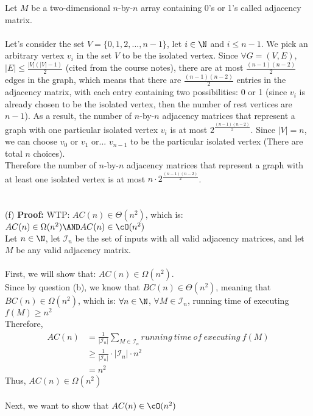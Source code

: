 \documentclass[12pt]{article}
\begin{document}
Let $M$ be a two-dimensional $n$-by-$n$ array containing 0's or 1's called adjacency matrix.\\
\\
Let's consider the set $V=\{0,1,2,...,n-1\}$, let $i\in \N$ and $i\le n-1$. We pick an arbitrary vertex $v_i$ in the set $V$ to be the isolated vertex. Since $\forall G=(V,E)$, $|E| \le \frac{|V|(|V|-1)}{2}$ (cited from the course notes), there are at most $\frac{(n-1)(n-2)}{2}$ edges in the graph, which means that there are $\frac{(n-1)(n-2)}{2}$ entries in the adjacency matrix, with each entry containing two possibilities: 0 or 1 (since $v_i$ is already chosen to be the isolated vertex, then the number of rest vertices are $n-1$). As a result, the number of $n$-by-$n$ adjacency matrices that represent a graph with one particular isolated vertex $v_i$ is at most $2^{\frac{(n-1)(n-2)}{2}}$. Since $|V| = n$, we can choose $v_0$ or $v_1$ or... $v_{n-1}$ to be the particular isolated vertex (There are total $n$ choices).\\
Therefore the number of $n$-by-$n$ adjacency matrices that represent a graph with at least one isolated vertex is at most $n\cdot 2^{\frac{(n-1)(n-2)}{2}}$.
\\
\\
\\
\noindent(f) \textbf{Proof:} WTP: $AC(n) \in \Theta(n^2)$, which is: $AC(n) \in \Omega(n^2) \AND AC(n) \in \cO(n^2)$\\
Let $n \in \N$, let $\mathcal{I}_n$ be the set of inputs with all valid adjacency matrices, and let $M$ be any valid adjacency matrix.\\
\\
First, we will show that: $AC(n) \in \Omega(n^2)$.\\
Since by question (b), we know that $BC(n) \in \Theta(n^2)$, meaning that $BC(n) \in \Omega(n^2)$, which is: $\forall n \in \N$, $\forall M \in \mathcal{I}_n$, running time of executing $f(M) \ge n^2$\\
Therefore,
\begin{align*}
    AC(n) &= \frac{1}{|\mathcal{I}_n|}\sum_{M\in \mathcal{I}_n}running\  time\ of\ executing\ f(M)\\
    \tag{since $BC(n) \in \Omega(n^2)$}
    &\ge \frac{1}{|\mathcal{I}_n|}\cdot |\mathcal{I}_n|\cdot n^2\\
    &= n^2
\end{align*}
Thus, $AC(n) \in \Omega(n^2)$\\
\\
Next, we want to show that $AC(n) \in \cO(n^2)$\\
\end{document}
